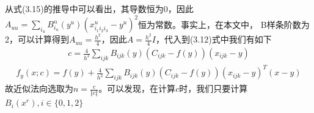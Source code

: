 从式(3.15)的推导中可以看出，其导数恒为0，因此$A_{uu} = \sum_{i_u} B_{i_u}^n(y^u) (x_{i_1 i_2 i_3}^u - y^u)^2$恒为常数。事实上，在本文中，
B样条阶数为2，可以计算得到$A_{uu} = \frac{h^2}{4}$，因此$A = \frac{h^2}{4}I$，代入到(3.12)式中我们有如下
\begin{equation}
    \begin{split}
        c = \frac{4}{h^2}\sum_{ijk}B_{ijk}(y)(C_{ijk} - f(y))(x_{ijk} - y)
    \end{split}
\end{equation}
\begin{equation}
    \begin{split}
        f_y(x;c) = f(y) + \frac{4}{h^2}\sum_{ijk}B_{ijk}(y)(C_{ijk} - f(y))(x_{ijk} - y)^T(x - y)
    \end{split}
\end{equation}
故近似法向选取为$n = \frac{c}{\Vert c\Vert}$。可以发现，在计算$c$时，我们只要计算$B_i(x^r), i \in \{0,1,2\}$




